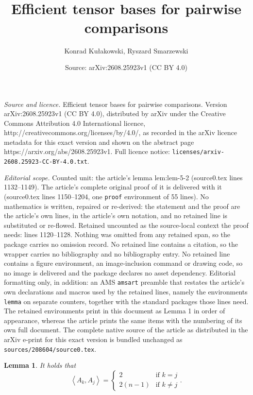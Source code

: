 \documentclass[10pt,a4paper]{amsart}
\title{Efficient tensor bases for pairwise comparisons}
\author{Konrad Ku{\l}akowski, Ryszard Smarzewski}
\date{Source: arXiv:2608.25923v1 (CC BY 4.0)}
\newtheorem{lemma}{Lemma}
\begin{document}
\maketitle

\noindent\emph{Source and licence.} Efficient tensor bases for pairwise comparisons. Version arXiv:2608.25923v1 (CC BY 4.0), distributed by arXiv under the Creative Commons Attribution 4.0 International licence, http://creativecommons.org/licenses/by/4.0/, as recorded in the arXiv licence metadata for this exact version and shown on the abstract page https://arxiv.org/abs/2608.25923v1. Full licence notice: \texttt{licenses/arxiv-2608.25923-CC-BY-4.0.txt}.\par\smallskip

\noindent\textit{Editorial scope.} Counted unit: the article's lemma lem:lem-5-2 (source0.tex lines 1132--1149). The article's complete original proof of it is delivered with it (source0.tex lines 1150--1204, one \texttt{proof} environment of 55 lines). No mathematics is written, repaired or re-derived: the statement and the proof are the article's own lines, in the article's own notation, and no retained line is substituted or re-flowed.  Retained uncounted as the source-local context the proof needs: lines 1120--1128.  Nothing was omitted from any retained span, so the package carries no omission record.  No retained line contains a citation, so the wrapper carries no bibliography and no bibliography entry.  No retained line contains a figure environment, an image-inclusion command or drawing code, so no image is delivered and the package declares no asset dependency.  Editorial formatting only, in addition: an AMS \texttt{amsart} preamble that restates the article's own declarations and macros used by the retained lines, namely the environments \texttt{lemma} on separate counters, together with the standard packages those lines need.  The retained environments print in this document as Lemma 1 in order of appearance, whereas the article prints the same items with the numbering of its own full document.  The complete native source of the article as distributed in the arXiv e-print for this exact version is bundled unchanged as \texttt{sources/208604/source0.tex}.
\begin{lemma}
\label{lem:lemma-5-1}It holds that 
\[
\left\langle A_{k},A_{j}\right\rangle =\begin{cases}
2 & \text{if}\,\,k=j\\
2(n-1) & \text{if}\,\,k\neq j
\end{cases}.
\]
\end{lemma}
\end{document}

